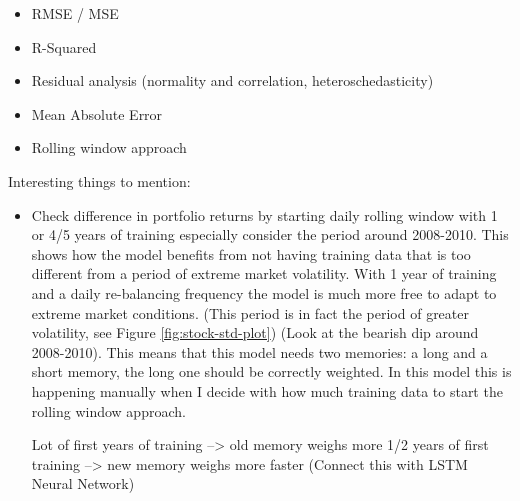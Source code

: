 \begin{itemize}
    \item RMSE / MSE
    \item R-Squared
    \item Residual analysis (normality and correlation, heteroschedasticity)
    \item Mean Absolute Error
    \item  Rolling window approach
\end{itemize}

Interesting things to mention:
\begin{itemize}
	\item Check difference in portfolio returns by starting daily rolling window with 1 or 4/5 years of training especially consider the period around 2008-2010. This shows how the model benefits from not having training data that is too different from a period of extreme market volatility. With 1 year of training and a daily re-balancing frequency the model is much more free to adapt to extreme market conditions. (This period is in fact the period of greater volatility, see Figure \ref{fig:stock-std-plot})
	(Look at the bearish dip around 2008-2010). This means that this model needs two memories: a long and a short memory, the long one should be correctly weighted. In this model this is happening manually when I decide with how much training data to start the rolling window approach.
	
	Lot of first years of training --> old memory weighs more
	1/2 years of first training --> new memory weighs more faster
	(Connect this with LSTM Neural Network)
\end{itemize}